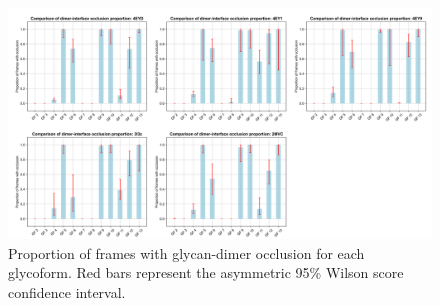 \documentclass[9pt]{elife}
\begin{document}
\renewcommand{\thefigure}{S\arabic{figure}}
\begin{figure}[H]
\centering
\includegraphics[width=1.0\textwidth]{Figures/occlusion_proportion_models_2.png}
\caption{Proportion of frames with glycan-dimer occlusion for each glycoform. Red bars represent the asymmetric 95\% Wilson score confidence interval.}
\label{supple_fig: occlusion_binomial}
\end{figure}


\end{document}
